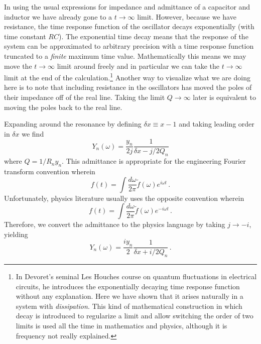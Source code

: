 In using the usual expressions for impedance and admittance of a capacitor and inductor we have already gone to a $t \rightarrow \infty$ limit.
However, because we have resistance, the time response function of the oscillator decays exponentially (with time constant $RC$).
The exponential time decay means that the response of the system can be approximated to arbitrary precision with a time response function truncated to a \emph{finite} maximum time value.
Mathematically this means we may move the $t \rightarrow \infty$ limit around freely and in particular we can take the $t \rightarrow \infty$ limit at the end of the calculation.\footnote{In Devoret's seminal Les Houches course on quantum fluctuations in electrical circuits, he introduces the exponentially decaying time response function without any explanation. Here we have shown that it arises naturally in a system with \emph{dissipation}. This kind of mathematical construction in which decay is introduced to regularize a limit and allow switching the order of two limits is used all the time in mathematics and physics, although it is frequency not really explained.}
Another way to visualize what we are doing here is to note that including resistance in the oscillators has moved the poles of their impedance off of the real line.
Taking the limit $Q \rightarrow \infty$ later is equivalent to moving the poles back to the real line.

Expanding around the resonance by defining $\delta x \equiv x - 1$ and taking leading order in $\delta x$ we find
\begin{equation}
Y_n(\omega) = \frac{y_n}{2j} \frac{1}{\delta x - j/2 Q_n}
\end{equation}
where $Q = 1 / R_n y_n$.
This admittance is appropriate for the engineering Fourier transform convention wherein
\begin{equation}
f(t) = \int \frac{d\omega}{2 \pi} \tilde{f}(\omega) e^{i \omega t} \, .
\end{equation}
Unfortunately, physics literature usually uses the opposite convention wherein
\begin{equation}
f(t) = \int \frac{d\omega}{2 \pi} \tilde{f}(\omega) e^{-i \omega t} \, .
\end{equation}
Therefore, we convert the admittance to the physics language by taking $j \rightarrow -i$, yielding
\begin{equation}
Y_n(\omega) = \frac{i y_n}{2} \frac{1}{\delta x + i/2 Q_n} \, . \label{eq:ch.decoherence.sec.caldeira-leggett:LC_admittance}
\end{equation}

